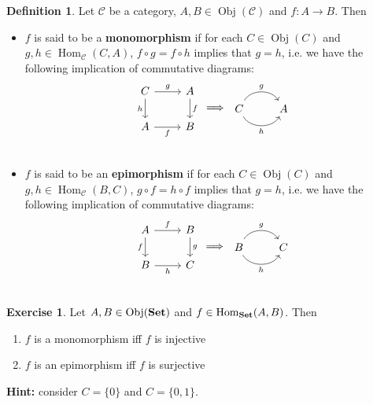 \documentclass{book}
\theoremstyle{definition}
\newtheorem{defn}[definition]{Definition}
\newtheorem{ex}[definition]{Exercise}
\newcommand{\MC}{\mathcal{C}}
\newcommand{\lex}[1]{\label{ex:#1}}
\newcommand{\ld}[1]{\label{defn:#1}}
\DeclareMathOperator{\Obj}{Obj}
\DeclareMathOperator{\Hom}{Hom}
\DeclareMathOperator*{\Set}{\text{\tbf{Set}}}
\DeclareMathOperator*{\0}{\mbf{0}}
\DeclareMathOperator*{\1}{\mbf{1}}
\newcommand{\tbf}[1]{\textbf{#1}}
\begin{document}
	\begin{defn} \ld{15009}
		Let $\MC$ be a category, $A,B \in \Obj(\MC)$ and $f:A \rightarrow B$. Then 
		\begin{itemize}
			\item 
			$f$ is said to be a \textbf{monomorphism} if for each $C \in \Obj(C)$ and $g,h \in \Hom_{\MC}(C, A)$, $f \circ g = f \circ h$ implies that $g = h$, i.e. we have the following implication of commutative diagrams: 
			\[ 
			\begin{tikzcd}[baseline= 7]
				C \arrow[r, "g"] \arrow[d, "h"'] & A \arrow[d, "f"] \\
				A \arrow[r, "f"'] & B\\
			\end{tikzcd}
			\implies
			\begin{tikzcd}[baseline= 7]
				C \arrow[bend right=60, swap]{r}{h} \arrow[bend right=-60]{r}{g} & A  \\
			\end{tikzcd}
			\]
			\item 
			$f$ is said to be an \textbf{epimorphism} if for each $C \in \Obj(C)$ and $g,h \in \Hom_{\MC}(B, C)$, $g \circ f = h \circ f$ implies that $g = h$, i.e. we have the following implication of commutative diagrams: \\
			\[ 
			\begin{tikzcd}[baseline= 7]
				A \arrow[r, "f"] \arrow[d, "f"'] & B \arrow[d, "g"] \\
				B \arrow[r, "h"'] & C\\
			\end{tikzcd}
			\implies
			\begin{tikzcd}[baseline= 7]
				B \arrow[bend right=60, swap]{r}{h} \arrow[bend right=-60]{r}{g} & C  \\
			\end{tikzcd}
			\]
		\end{itemize}
	\end{defn}
	
	\begin{ex} \lex{15010}
		Let $A, B \in \Obj(\Set)$ and $f \in \Hom_{\Set}(A,B)$. Then 
		\begin{enumerate}
			\item $f$ is a monomorphism iff $f$ is injective
			\item $f$ is an epimorphism iff $f$ is surjective 
		\end{enumerate} 
		\tbf{Hint: } consider $C = \{0\}$ and $C = \{0,1\}$.
	\end{ex}
	
\end{document}
